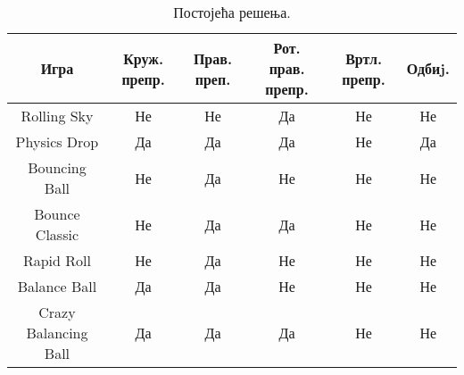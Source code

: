 \begin{table}[H]
\begin{tabular}{|c|c|c|c|c|c|}
\hline
Игра & Круж. препр.& Прав. преп.& Рот. прав. препр.& Вртл. препр.& Одбиj.\\
\hline
Rolling Sky  & Не & Не &  Да&Не&Не\\
Physics Drop  & Да & Да &  Да & Не&Да\\
Bouncing Ball & Не & Да&  Не& Не&Не\\
Bounce Classic & Не & Да &  Да& Не&Не\\
Rapid Roll  & Не & Да&  Не& Не&Не\\
Balance Ball& Да & Да&  Не &Не&Не\\
Crazy Balancing Ball & Да & Да&  Да &Не&Не\\

\hline
\end{tabular}

\caption{Постојећа решења.} \label{ExistingSolutions3}
\end{table}


